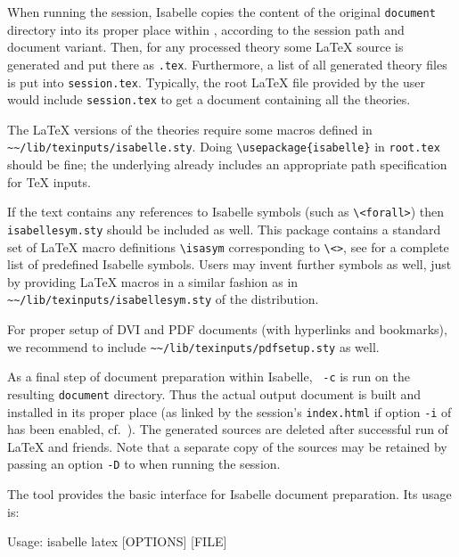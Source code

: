 \begin{isabellebody}
\begin{isamarkuptext}
  \medskip When running the session, Isabelle copies the content of
  the original \verb|document| directory into its proper place
  within \hyperlink{setting.ISABELLE-BROWSER-INFO}{\mbox{}}, according to the session
  path and document variant.  Then, for any processed theory 
  some {\LaTeX} source is generated and put there as \verb|.tex|.  Furthermore, a list of all generated theory
  files is put into \verb|session.tex|.  Typically, the root
  {\LaTeX} file provided by the user would include \verb|session.tex| to get a document containing all the theories.

  The {\LaTeX} versions of the theories require some macros defined in
  \verb|~~/lib/texinputs/isabelle.sty|.  Doing \verb|\usepackage{isabelle}| in \verb|root.tex| should be fine;
  the underlying \hyperlink{tool.latex}{\mbox{}} already includes an appropriate path
  specification for {\TeX} inputs.

  If the text contains any references to Isabelle symbols (such as
  \verb|\|\verb|<forall>|) then \verb|isabellesym.sty| should be included as well.  This package
  contains a standard set of {\LaTeX} macro definitions \verb|\isasym| corresponding to \verb|\|\verb|<|\verb|>|, see \cite{isabelle-implementation} for a
  complete list of predefined Isabelle symbols.  Users may invent
  further symbols as well, just by providing {\LaTeX} macros in a
  similar fashion as in \verb|~~/lib/texinputs/isabellesym.sty| of
  the distribution.

  For proper setup of DVI and PDF documents (with hyperlinks and
  bookmarks), we recommend to include \verb|~~/lib/texinputs/pdfsetup.sty| as well.

  \medskip As a final step of document preparation within Isabelle,
  \hyperlink{tool.document}{\mbox{}}~\verb|-c| is run on the resulting \verb|document| directory.  Thus the actual output document is built and
  installed in its proper place (as linked by the session's \verb|index.html| if option \verb|-i| of \hyperlink{tool.usedir}{\mbox{}} has
  been enabled, cf.\ ).  The generated sources are
  deleted after successful run of {\LaTeX} and friends.  Note that a
  separate copy of the sources may be retained by passing an option
  \verb|-D| to \hyperlink{tool.usedir}{\mbox{}} when running the session.%
\end{isamarkuptext}%
\isamarkuptrue%
%
\isamarkuptrue%
%
\begin{isamarkuptext}%
The \hypertarget{tool.latex}{\hyperlink{tool.latex}{\mbox{}}} tool provides the basic interface for
  Isabelle document preparation.  Its usage is:
\begin{ttbox}
Usage: isabelle latex [OPTIONS] [FILE]


\end{ttbox}
\end{isamarkuptext}
\end{isabellebody}
